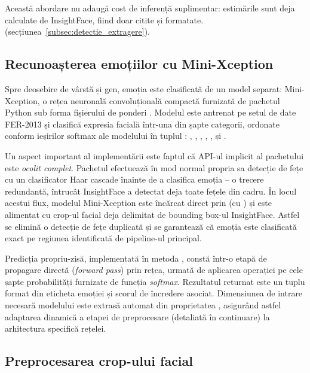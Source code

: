\documentclass[../../main.tex]{subfiles}
\begin{document}
Această abordare nu adaugă cost de inferență suplimentar: estimările sunt deja calculate
de InsightFace, fiind doar citite și formatate.
(secțiunea~\ref{subsec:detectie_extragere}).

\subsection{Recunoașterea emoțiilor cu Mini-Xception}
\label{subsec:emotii_xception}

Spre deosebire de vârstă și gen, emoția este clasificată de un model separat:
Mini-Xception, o rețea neuronală convoluțională compactă furnizată de pachetul Python
 sub forma fișierului de ponderi . Modelul este
antrenat pe setul de date FER-2013 și clasifică expresia facială într-una din șapte categorii,
ordonate conform ieșirilor softmax ale modelului în tuplul :
, , , ,
,  și .

Un aspect important al implementării este faptul că API-ul implicit al pachetului
 este \textit{ocolit complet}. Pachetul  efectuează în mod
normal propria sa detecție de fețe cu un clasificator Haar cascade înainte de a clasifica
emoția -- o trecere redundantă, întrucât InsightFace a detectat deja toate fețele din cadru.
În locul acestui flux, modelul Mini-Xception este încărcat direct prin
 (cu ) și este alimentat
cu crop-ul facial deja delimitat de bounding box-ul InsightFace. Astfel se elimină o
detecție de fețe duplicată și se garantează că emoția este clasificată exact pe regiunea
identificată de pipeline-ul principal.

Predicția propriu-zisă, implementată în metoda , constă într-o etapă de propagare directă (\emph{forward pass}) prin rețea, urmată de aplicarea operației  pe cele șapte probabilități furnizate de funcția \emph{softmax}. Rezultatul returnat este un tuplu format din eticheta emoției și scorul de încredere asociat. Dimensiunea de intrare necesară modelului este extrasă automat din proprietatea , asigurând astfel adaptarea dinamică a etapei de preprocesare (detaliată în continuare) la arhitectura specifică rețelei.


\subsection{Preprocesarea crop-ului facial}
\label{subsec:preprocesare_crop}
\end{document}
